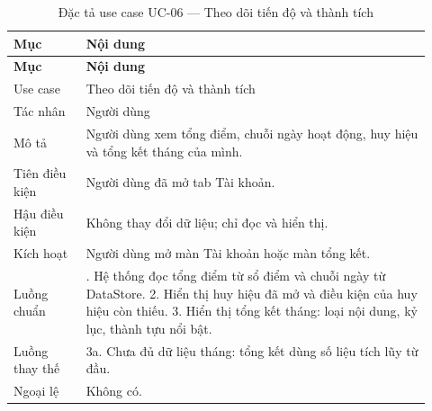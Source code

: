 \begingroup\small\renewcommand{\arraystretch}{1.15}\setlength{\tabcolsep}{3pt}
\begin{longtable}{>{\RaggedRight\arraybackslash}p{0.16\linewidth}>{\RaggedRight\arraybackslash}p{0.76\linewidth}}
\caption{Đặc tả use case UC-06 --- Theo dõi tiến độ và thành tích}
\label{tab:spec-uc-06}\\
\toprule
\textbf{Mục} & \textbf{Nội dung} \\
\midrule
\endfirsthead
\toprule
\textbf{Mục} & \textbf{Nội dung} \\
\midrule
\endhead
\bottomrule
\endfoot
Use case & Theo dõi tiến độ và thành tích \\
Tác nhân & Người dùng \\
Mô tả & Người dùng xem tổng điểm, chuỗi ngày hoạt động, huy hiệu và tổng kết tháng của mình. \\
Tiên điều kiện & Người dùng đã mở tab Tài khoản. \\
Hậu điều kiện & Không thay đổi dữ liệu; chỉ đọc và hiển thị. \\
Kích hoạt & Người dùng mở màn Tài khoản hoặc màn tổng kết. \\
Luồng chuẩn & 1. Hệ thống đọc tổng điểm từ sổ điểm và chuỗi ngày từ DataStore. 2. Hiển thị huy hiệu đã mở và điều kiện của huy hiệu còn thiếu. 3. Hiển thị tổng kết tháng: loại nội dung, kỷ lục, thành tựu nổi bật. \\
Luồng thay thế & 3a. Chưa đủ dữ liệu tháng: tổng kết dùng số liệu tích lũy từ đầu. \\
Ngoại lệ & Không có. \\
\end{longtable}
\endgroup

